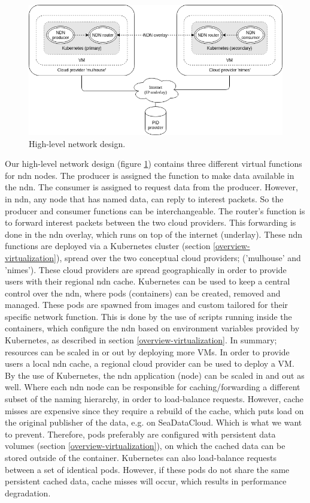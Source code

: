 \begin{figure}[H]
\centering
\includegraphics[width=\columnwidth]{Images/high-level-network-design.png}
\caption{High-level network design.}
\label{fig:high-level-network-design}
\end{figure}

Our high-level network design (figure \ref{fig:high-level-network-design}) contains three different virtual functions for \gls{ndn} nodes. The producer is assigned the function to make data available in the \gls{ndn}. The consumer is assigned to request data from the producer. However, in \gls{ndn}, any node that has named data, can reply to interest packets. So the producer and consumer functions can be interchangeable. The router's function is to forward interest packets between the two cloud providers. This forwarding is done in the \gls{ndn} overlay, which runs on top of the internet (underlay). These \gls{ndn} functions are deployed via a Kubernetes cluster (section \ref{overview-virtualization}), spread over the two conceptual cloud providers; ('mulhouse' and 'nimes'). These cloud providers are spread geographically in order to provide users with their regional \gls{ndn} cache. Kubernetes can be used to keep a central control over the \gls{ndn}, where pods (containers) can be created, removed and managed. These pods are spawned from images and custom tailored for their specific network function. This is done by the use of scripts running inside the containers, which configure the \gls{ndn} based on environment variables provided by Kubernetes, as described in section \ref{overview-virtualization}. In summary; resources can be scaled in or out by deploying more VMs. In order to provide users a local \gls{ndn} cache, a regional cloud provider can be used to deploy a VM. By the use of Kubernetes, the \gls{ndn} application (node) can be scaled in and out as well. Where each \gls{ndn} node can be responsible for caching/forwarding a different subset of the naming hierarchy, in order to load-balance requests. However, cache misses are expensive since they require a rebuild of the cache, which puts load on the original publisher of the data, e.g. on SeaDataCloud. Which is what we want to prevent. Therefore, pods preferably are configured with persistent data volumes (section \ref{overview-virtualization}), on which the cached data can be stored outside of the container. Kubernetes can also load-balance requests between a set of identical pods. However, if these pods do not share the same persistent cached data, cache misses will occur, which results in performance degradation.

